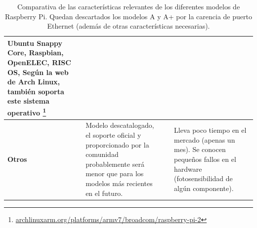 \begin{landscape}
\begin{table}[h]
\begin{tabular}{|p{3.2cm}|p{6cm}|p{6cm}|p{6cm}|}
Ubuntu Snappy Core, Raspbian, OpenELEC, RISC OS, Según la web de Arch Linux, también soporta este sistema operativo \footnote{\href{http://archlinuxarm.org/platforms/armv7/broadcom/raspberry-pi-2}{archlinuxarm.org/platforms/armv7/broadcom/raspberry-pi-2}} \\

\hline %

\textbf{Otros} & Modelo descatalogado, el soporte oficial y proporcionado por la comunidad probablemente será menor que para los modelos más recientes en el futuro. &  & Lleva poco tiempo en el mercado (apenas un mes). Se conocen pequeños fallos en el hardware (fotosensibilidad de algún componente).\\ \hline

\end{tabular}
\caption[Comparativa de las características relevantes de los diferentes modelos de Raspberry Pi]{Comparativa de las características relevantes de los diferentes modelos de Raspberry Pi.
Quedan descartados los modelos A y A+ por la carencia de puerto Ethernet (además de otras características necesarias).}
\end{table}
\end{landscape}

